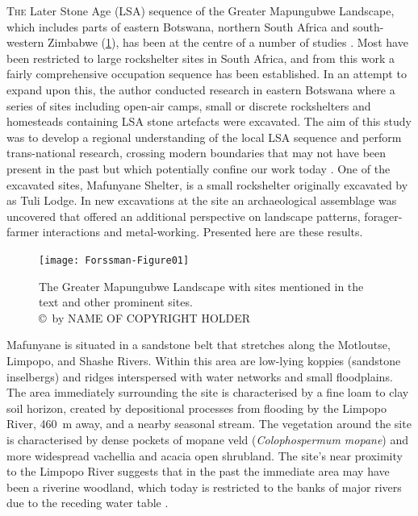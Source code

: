 \documentclass{ijsra}
\begin{document}
\IJSRAopening

\lettrine{T}{he} Later Stone Age (LSA) sequence of the Greater Mapungubwe Landscape, which includes parts of eastern Botswana, northern South Africa and south-western Zimbabwe (\cref{fig:Forssman-Figure01}), has been at the centre of a number of studies \parencites[e.g.][]{Hall_2000,vanDoornum_2005,vanDoornum_2007,vanDoornum_2008,vanDoornum_2014,Forssman_2010,Forssman_2013a,Forssman_2013b,Forssman_2013c,Forssman_2014a,Forssman_2014b}. 
Most have been restricted to large rockshelter sites in South Africa, and from this work a fairly comprehensive occupation sequence has been established. In an attempt to expand upon this, the author conducted research in eastern Botswana where a series of sites including open-air camps, small or discrete rockshelters and homesteads containing LSA stone artefacts were excavated. The aim of this study was to develop a regional understanding of the local LSA sequence and perform trans-national research, crossing modern boundaries that may not have been present in the past but which potentially confine our work today \parencites[for details see][]{Forssman_2014a}{Forssman_2014b}{Forssman_2013c}{Forssman_2015}. One of the excavated sites, Mafunyane Shelter, is a small rockshelter originally excavated by \textcite{Walker_1994} as Tuli Lodge. 
In new excavations at the site an archaeological assemblage was uncovered that offered an additional perspective on landscape patterns, forager-farmer interactions and metal-working. Presented here are these results.
	
\begin{figure}
		\texttt{[image: Forssman-Figure01]}
 \caption{The Greater Mapungubwe Landscape with sites mentioned in the text and other prominent sites.
     {\normalfont \\ \copyright\ by NAME OF COPYRIGHT HOLDER}}
		\label{fig:Forssman-Figure01}
\end{figure}

Mafunyane  is situated in a sandstone belt that stretches along the Motloutse, Limpopo, and Shashe Rivers. Within this area are low-lying koppies (sandstone inselbergs) and ridges interspersed with water networks and small floodplains. The area immediately surrounding the site is characterised by a fine loam to clay soil horizon, created by depositional processes from flooding by the Limpopo River, \SI{460}{\meter} away, and a nearby seasonal stream. 
	The vegetation around the site is characterised by dense pockets of mopane veld (\emph{Colophospermum mopane}) and more widespread vachellia and acacia open shrubland. The site’s near proximity to the Limpopo River suggests that in the past the immediate area may have been a riverine woodland, which today is restricted to the banks of major rivers due to the receding water table \parencite{Alexander_1984}. 
	
\end{document}
